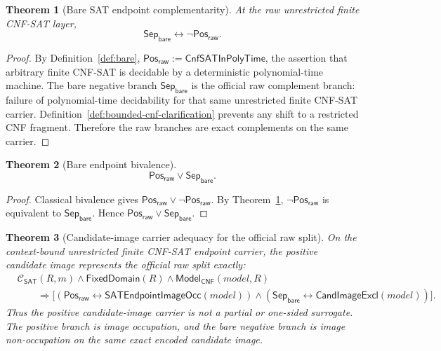\documentclass[11pt]{article}
\newtheorem{theorem}{Theorem}[section]
\theoremstyle{definition}
\theoremstyle{remark}
\newcommand{\PosRaw}{\mathsf{Pos}_{\mathsf{raw}}}
\newcommand{\SepBare}{\mathsf{Sep}_{\mathsf{bare}}}
\newcommand{\CnfSATP}{\mathsf{CnfSATInPolyTime}}
\newcommand{\ClayCtx}{\mathcal{C}_{\mathsf{SAT}}(R,m)}
\newcommand{\FixedDom}{\mathsf{FixedDomain}}
\newcommand{\ModelOfCnf}{\mathsf{Model}_{\mathsf{CNF}}}
\newcommand{\CandImageExcl}{\mathsf{CandImageExcl}}
\newcommand{\SATEndpointImageOcc}{\mathsf{SATEndpointImageOcc}}
\begin{document}
\begin{theorem}[Bare SAT endpoint complementarity]\label{thm:bare-complement}
At the raw unrestricted finite CNF-SAT layer,
\[
  \SepBare\leftrightarrow\neg\PosRaw.
\]
\end{theorem}

\begin{proof}
By Definition~\ref{def:bare}, \(\PosRaw:=\CnfSATP\), the assertion that arbitrary finite CNF-SAT is decidable by a deterministic polynomial-time machine. The bare negative branch \(\SepBare\) is the official raw complement branch: failure of polynomial-time decidability for that same unrestricted finite CNF-SAT carrier. Definition~\ref{def:bounded-cnf-clarification} prevents any shift to a restricted CNF fragment. Therefore the raw branches are exact complements on the same carrier.
\end{proof}

\begin{theorem}[Bare endpoint bivalence]\label{thm:bare-bivalence}
\[
  \PosRaw\vee\SepBare.
\]
\end{theorem}

\begin{proof}
Classical bivalence gives \(\PosRaw\vee\neg\PosRaw\). By Theorem~\ref{thm:bare-complement}, \(\neg\PosRaw\) is equivalent to \(\SepBare\). Hence \(\PosRaw\vee\SepBare\).
\end{proof}

\begin{theorem}[Candidate-image carrier adequacy for the official raw split]\label{thm:candidate-image-carrier-adequacy-raw-split}
On the context-bound unrestricted finite CNF-SAT endpoint carrier, the positive candidate image represents the official raw split exactly:
\[
\begin{aligned}
  &\ClayCtx\wedge\FixedDom(R)\wedge\ModelOfCnf(model,R)\\
  &\qquad\Rightarrow
  \bigl[(\PosRaw\leftrightarrow\SATEndpointImageOcc(model))
  \wedge(\SepBare\leftrightarrow\CandImageExcl(model))\bigr].
\end{aligned}
\]
Thus the positive candidate-image carrier is not a partial or one-sided surrogate. The positive branch is image occupation, and the bare negative branch is image non-occupation on the same exact encoded candidate image.
\end{theorem}
\end{document}
